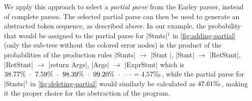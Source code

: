 

We apply this approach to select a \emph{partial parse} from the Earley parser,
instead of complete parses. The selected partial parse can then be used to
generate an abstracted token sequence, as described above. In our example, the
probability that would be assigned to the partial parse for |Stmts|$^1$ in
\autoref{fig:adding-partial} (only the sub-tree without the colored error nodes)
is the product of the probabilities of the production rules |Stmts|
$\rightarrow$ |Stmt \n|, |Stmt| $\rightarrow$ |RetStmt|, |RetStmt| $\rightarrow$
|return Args|, |Args| $\rightarrow$ |ExprStmt| \etc which is $38.77\%\ \cdot\
7.59\%\ \cdot\ 98.39\%\ \cdot\ 99.20\%\ \cdot\ \dots =
4.57\text{\textperthousand}$, while the partial parse for |Stmts|$^1$ in
\autoref{fig:deleting-partial} would similarly be calculated as
$47.61\text{\textperthousand}$, making it the proper choice for the abstraction
of the program.

